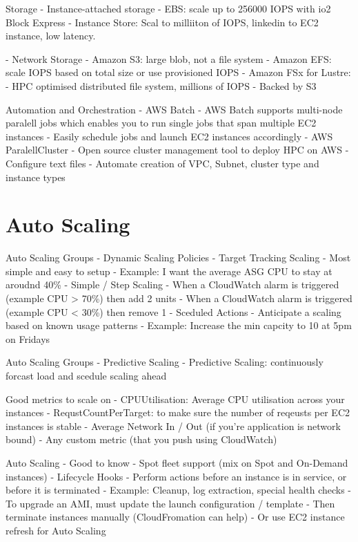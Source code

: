 \documentclass[11pt]{book}
\begin{document}
    Storage
    - Instance-attached storage
        - EBS: scale up to 256000 IOPS with io2 Block Express
        - Instance Store: Scal to milliiton of IOPS, linkedin to EC2 instance, low latency.

    - Network Storage
        - Amazon S3: large blob, not a file system
        - Amazon EFS: scale IOPS based on total size or use provisioned IOPS
        - Amazon FSx for Lustre:
            - HPC optimised distributed file system, millions of IOPS
            - Backed by S3

    Automation and Orchestration
    - AWS Batch
        - AWS Batch supports multi-node paralell jobs which enables you to run single jobs that span multiple EC2 instances
        - Easily schedule jobs and launch EC2 instances accordingly
    - AWS ParalellCluster
        - Open source cluster management tool to deploy HPC on AWS
        - Configure text files
        - Automate creation of VPC, Subnet, cluster type and instance types

    \section{Auto Scaling}
    Auto Scaling Groups - Dynamic Scaling Policies
    - Target Tracking Scaling
        - Most simple and easy to setup
        - Example: I want the average ASG CPU to stay at aroudnd 40\%
    - Simple / Step Scaling
        - When a CloudWatch alarm is triggered (example CPU  > 70\%) then add 2 units
        - When a CloudWatch alarm is triggered (example CPU < 30\%) then remove 1
    - Sceduled Actions
        - Anticipate a scaling based on known usage patterns
        - Example: Increase the min capcity to 10 at 5pm on Fridays


    Auto Scaling Groups - Predictive Scaling
    - Predictive Scaling: continuously forcast load and scedule scaling ahead

    Good metrics to scale on
    - CPUUtilisation: Average CPU utilisation across your instances
    - RequstCountPerTarget: to make sure the number of reqeusts per EC2 instances is stable
    - Average Network In / Out (if you're application is network bound)
    - Any custom metric (that you push using CloudWatch)

    Auto Scaling - Good to know
    - Spot fleet support (mix on Spot and On-Demand instances)
    - Lifecycle Hooks
        - Perform actions before an instance is in service, or before it is terminated
        - Example: Cleanup, log extraction, special health checks
    - To upgrade an AMI, must update the launch configuration / template
        - Then terminate instances manually (CloudFromation can help)
        - Or use EC2 instance refresh for Auto Scaling
\end{document}
